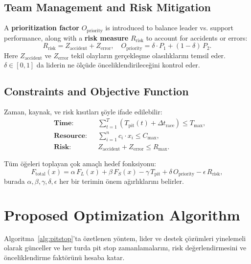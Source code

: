 \documentclass[preprint,12pt]{elsarticle}
\begin{document}
\subsection{Team Management and Risk Mitigation}
A \textbf{prioritization factor} $O_{\mathrm{priority}}$ is introduced to balance leader vs. support performance, along with a \textbf{risk measure} $R_{\mathrm{risk}}$ to account for accidents or errors:
\begin{equation}
R_{\mathrm{risk}} = Z_{\mathrm{accident}} + Z_{\mathrm{error}}, \quad
O_{\mathrm{priority}} = \delta \cdot P_1 + (1 - \delta)\, P_2.
\end{equation}
Here $Z_{\mathrm{accident}}$ ve $Z_{\mathrm{error}}$ tekil olayların gerçekleşme olasılıklarını temsil eder. $\delta \in [0,1]$ da liderin ne ölçüde önceliklendirileceğini kontrol eder.

\subsection{Constraints and Objective Function}
Zaman, kaynak, ve risk kısıtları şöyle ifade edilebilir:
\begin{align}
& \textbf{Time:} && \sum_{t=1}^{T} (T_{\mathrm{pit}}(t) + \Delta t_{\mathrm{race}}) \le T_{\max}, \\
& \textbf{Resource:} && \sum_{i=1}^{n} c_i \cdot x_i \le C_{\max}, \\
& \textbf{Risk:} && Z_{\mathrm{accident}} + Z_{\mathrm{error}} \le R_{\max}.
\end{align}

Tüm öğeleri toplayan çok amaçlı hedef fonksiyonu:
\begin{equation}
\label{eq:objective}
F_{\text{total}}(x) = \alpha \, F_L(x)
                     + \beta \, F_S(x)
                     - \gamma \, T_{\mathrm{pit}}
                     + \delta \, O_{\mathrm{priority}}
                     - \epsilon \, R_{\mathrm{risk}},
\end{equation}
burada $\alpha, \beta, \gamma, \delta, \epsilon$ her bir terimin önem ağırlıklarını belirler.

\section{Proposed Optimization Algorithm}
\label{sec:algorithm}

Algoritma~\ref{alg:pitstop}’ta özetlenen yöntem, lider ve destek çözümleri yinelemeli olarak günceller ve her turda pit stop zamanlamalarını, risk değerlendirmesini ve önceliklendirme faktörünü hesaba katar. 
\end{document}
